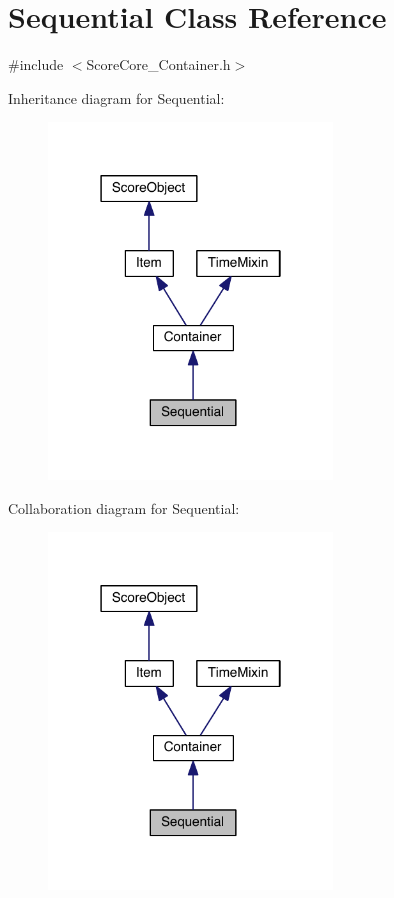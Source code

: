 \hypertarget{class_sequential}{\section{Sequential Class Reference}
\label{class_sequential}
}


{\ttfamily \#include $<$Score\-Core\-\_\-\-Container.\-h$>$}



Inheritance diagram for Sequential\-:\nopagebreak
\begin{figure}[H]
\begin{center}
\leavevmode
\includegraphics[width=214pt]{class_sequential__inherit__graph}
\end{center}
\end{figure}


Collaboration diagram for Sequential\-:\nopagebreak
\begin{figure}[H]
\begin{center}
\leavevmode
\includegraphics[width=214pt]{class_sequential__coll__graph}
\end{center}
\end{figure}

